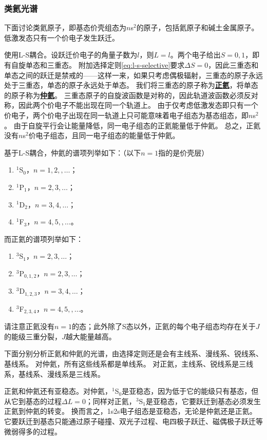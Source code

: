 \documentclass[UTF8, a4paper]{ctexart}
\newcommand*{\lsterm}[3]{$^{#1}${#2}$_{#3}$}
\newcommand*{\concept}[1]{\underline{\textbf{#1}}}
\begin{document}
\subsubsection{类氦光谱}

下面讨论类氦原子，即基态价壳组态为$n$s$^2$的原子，包括氦原子和碱土金属原子。
低激发态只有一个价电子发生跃迁。

使用L-S耦合。设跃迁价电子的角量子数为$l$，则$L=l$。两个电子给出$S=0, 1$，即有自旋单态和三重态。
附加选择定则\eqref{eq:l-s-selective}要求$\Delta S=0$，因此三重态和单态之间的跃迁是禁戒的——这样一来，如果只考虑偶极辐射，三重态的原子永远处于三重态，单态的原子永远处于单态。
我们将三重态的原子称为\concept{正氦}，将单态的原子称为\concept{仲氦}。
三重态原子的自旋波函数是对称的，因此轨道波函数必须反对称，因此两个价电子不能出现在同一个轨道上。
由于仅考虑低激发态即只有一个价电子，两个价电子出现在同一轨道上只可能意味着电子组态为基态组态，即$n$s$^2$。
由于自旋平行会让能量降低，同一电子组态的正氦能量低于仲氦。
总之，正氦没有$n$s$^2$价电子组态，且同一电子组态的能量低于仲氦。

基于L-S耦合，仲氦的谱项列举如下：（以下$n=1$指的是价壳层）
\begin{enumerate}
    \item \lsterm{1}{S}{0}，$n=1, 2, ,\ldots$；
    \item \lsterm{1}{P}{1}，$n=2, 3, \ldots$；
    \item \lsterm{1}{D}{2}，$n=3, 4, \ldots$；
    \item \lsterm{1}{F}{3}，$n=4, 5, ,\ldots$。
\end{enumerate}
而正氦的谱项列举如下：
\begin{enumerate}
    \item \lsterm{3}{S}{1}，$n=2, 3,\ldots$；
    \item \lsterm{3}{P}{0,1,2}，$n=2, 3, \ldots$；
    \item \lsterm{3}{D}{1,2,3}，$n=3, 4, \ldots$；
    \item \lsterm{3}{F}{2,3,4}，$n=4, 5, ,\ldots$。
\end{enumerate}
请注意正氦没有$n=1$的态；此外除了S态以外，正氦的每个电子组态均存在关于$J$的能级三重分裂，$J$越大能量越高。

下面分别分析正氦和仲氦的光谱，由选择定则还是会有主线系、漫线系、锐线系、基线系。
对仲氦，所有这些线系都是单线系。
对正氦，主线系、锐线系是三线系，基线系、漫线系是三线系。

正氦和仲氦还有亚稳态。对仲氦，\lsterm{1}{S}{0}是亚稳态，因为低于它的能级只有基态，但从它到基态的过程$\Delta L = 0$；同样对正氦，\lsterm{3}{S}{1}是亚稳态，它要跃迁到基态必须发生正氦到仲氦的转变。
换而言之，1s2s电子组态是亚稳态，无论是仲氦还是正氦。它要跃迁到基态只能通过原子碰撞、双光子过程、电四极子跃迁、磁偶极子跃迁等微弱得多的过程。
\end{document}
